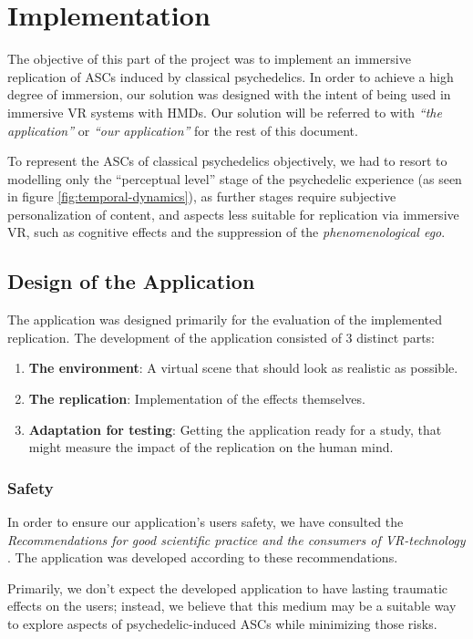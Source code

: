 \chapter{Implementation}
The objective of this part of the project was to implement an immersive replication of \acp{ASC} induced by classical psychedelics. In order to achieve a high degree of immersion, our solution was designed with the intent of being used in immersive \ac{VR} systems with \acp{HMD}. Our solution will be referred to with \textit{``the application''} or \textit{``our application''} for the rest of this document.

To represent the \acp{ASC} of classical psychedelics objectively, we had to resort to modelling only the ``perceptual level'' stage of the psychedelic experience (as seen in figure \ref{fig:temporal-dynamics}), as further stages require subjective personalization of content, and aspects less suitable for replication via immersive \ac{VR}, such as cognitive effects and the suppression of the \textit{phenomenological ego}.

\section{Design of the Application}
The application was designed primarily for the evaluation of the implemented replication. The development of the application consisted of 3 distinct parts:

\begin{enumerate}
    \item \textbf{The environment}: A virtual scene that should look as realistic as possible.
    \item \textbf{The replication}: Implementation of the effects themselves.
    \item \textbf{Adaptation for testing}: Getting the application ready for a study, that might measure the impact of the replication on the human mind.
\end{enumerate}

\subsection{Safety}
In order to ensure our application's users safety, we have consulted the \textit{Recommendations for good scientific practice and the consumers of VR-technology} \autocite{madary2016real}. The application was developed according to these recommendations.

Primarily, we don't expect the developed application to have lasting traumatic effects on the users; instead, we believe that this medium may be a suitable way to explore aspects of psychedelic-induced \acp{ASC} while minimizing those risks.

